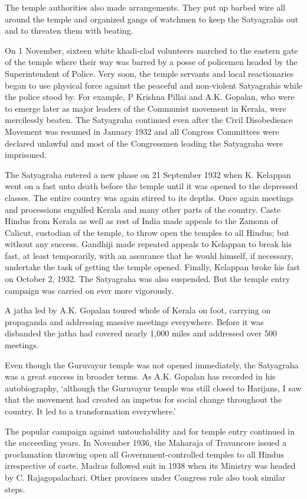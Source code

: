 \begin{multicols}{2}
The temple authorities also made arrangements. They put up barbed wire all around the temple and organized gangs of watchmen to keep the Satyagrahis out and to threaten them with beating.

On 1 November, sixteen white khadi-clad volunteers marched to the eastern gate of the temple where their way was barred by a posse of policemen headed by the Superintendent of Police. Very soon, the temple servants and local reactionaries began to use physical force against the peaceful and non-violent Satyagrahis while the police stood by. For example, P Krishna Pillai and A.K. Gopalan, who were to emerge later as major leaders of the Communist movement in Kerala, were mercilessly beaten. The Satyagraha continued even after the Civil Disobedience Movement was resumed in January 1932 and all Congress Committees were declared unlawful and most of the Congressmen leading the Satyagraha were imprisoned.

The Satyagraha entered a new phase on 21 September 1932 when K. Kelappan went on a fast unto death before the temple until it was opened to the depressed classes. The entire country was again stirred to its depths. Once again meetings and processions engulfed Kerala and many other parts of the country. Caste Hindus from Kerala as well as rest of India made appeals to the Zamonn of Calicut, custodian of the temple, to throw open the temples to all Hindus; but without any success. Gandhiji made repeated appeals to Kelappan to break his fast, at least temporarily, with an assurance that he would himself, if necessary, undertake the task of getting the temple opened. Finally, Kelappan broke his fast on October 2, 1932. The Satyagraha was also suspended. But the temple entry campaign was carried on ever more vigorously.

A jatha led by A.K. Gopalan toured whole of Kerala on foot, carrying on propaganda and addressing massive meetings everywhere. Before it was disbanded the jatha had covered nearly 1,000 miles and addressed over 500 meetings.

Even though the Guruvayur temple was not opened immediately, the Satyagraha was a great success in broader terms. As A.K. Gopalan has recorded in his autobiography, `although the Guruvayur temple was still closed to Harijans, I saw that the movement had created an impetus for social change throughout the country. It led to a transformation everywhere.'

The popular campaign against untouchability and for temple entry continued in the succeeding years. In November 1936, the Maharaja of Travancore issued a proclamation throwing open all Government-controlled temples to all Hindus irrespective of caste. Madras followed suit in 1938 when its Ministry was headed by C. Rajagopalachari. Other provinces under Congress rule also took similar steps.


\end{multicols}
